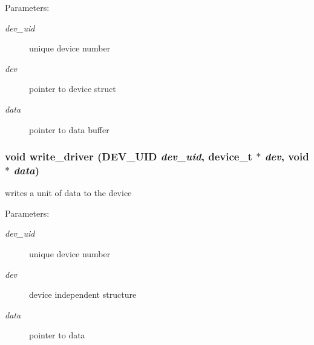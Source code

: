 \begin{Desc}
\item[Parameters:]
\begin{description}
\item[{\em dev\_\-uid}]unique device number \item[{\em dev}]pointer to device struct \item[{\em data}]pointer to data buffer \end{description}
\end{Desc}
\hypertarget{group__device__driver_gc3f852bf9a4da163836eb9bdd23e6dd8}{
\subsubsection[{write\_\-driver}]{\setlength{\rightskip}{0pt plus 5cm}void write\_\-driver ({\bf DEV\_\-UID} {\em dev\_\-uid}, \/  device\_\-t $\ast$ {\em dev}, \/  void $\ast$ {\em data})}}
\label{group__device__driver_gc3f852bf9a4da163836eb9bdd23e6dd8}


writes a unit of data to the device 

\begin{Desc}
\item[Parameters:]
\begin{description}
\item[{\em dev\_\-uid}]unique device number \item[{\em dev}]device independent structure \item[{\em data}]pointer to data \end{description}
\end{Desc}
